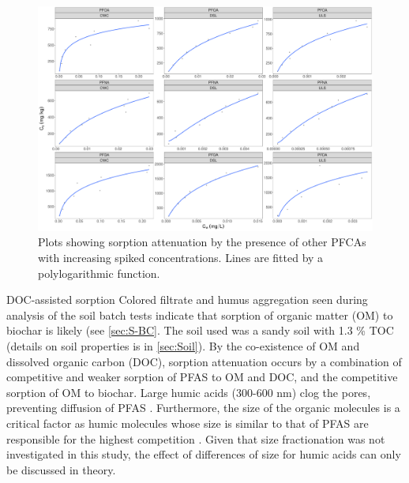 \begin{figure}
    \centering
    \includegraphics[width=\textwidth]{R/figs/BC_single_attenuation.pdf}
    \caption{Plots showing sorption attenuation by the presence of other PFCAs with increasing spiked concentrations. Lines are fitted by a polylogarithmic function.}
    \label{fig:nonlinear_OND} 
\end{figure}

DOC-assisted sorption 
Colored filtrate and humus aggregation seen during analysis of the soil batch tests indicate that sorption of organic matter (OM) to biochar is likely (see \cref{sec:S-BC}. The soil used was a sandy soil with 1.3 \% TOC (details on soil properties is in \cref{sec:Soil}). By the co-existence of OM and dissolved organic carbon (DOC), sorption attenuation occurs by a combination of competitive and weaker sorption of PFAS to OM and DOC, and the competitive sorption of OM to biochar. Large humic acids (300-600 nm) clog the pores, preventing diffusion of PFAS \citep{Cornelissen2006,kluvcakova2018size}. Furthermore, the size of the organic molecules is a critical factor as humic molecules whose size is similar to that of PFAS are responsible for the highest competition \citep{du2014adsorption}. Given that size fractionation was not investigated in this study, the effect of differences of size for humic acids can only be discussed in theory.


